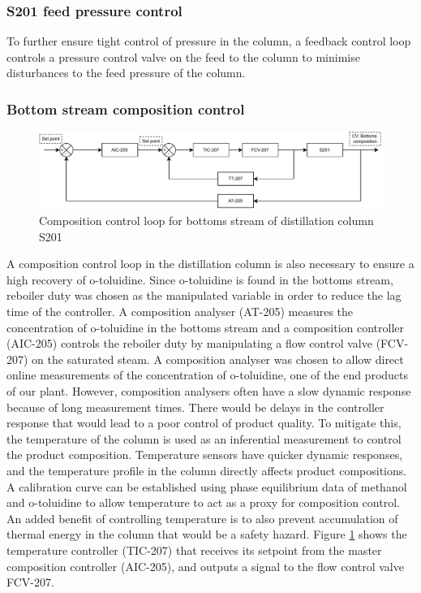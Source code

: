 \subsubsection{S201 feed pressure control} %
To further ensure tight control of pressure in the column, a feedback control loop controls a pressure control valve on the feed to the column to minimise disturbances to the feed pressure of the column.



\subsubsection{Bottom stream composition control} %
\begin{figure}
    \centering
    \includegraphics[width=\linewidth]{chapters/4-operation-control/4-Figures/S201-CC.pdf}
    \caption{Composition control loop for bottoms stream of distillation column S201}
    \label{fig:S201-CC}
\end{figure}
A composition control loop in the distillation column is also necessary to ensure a high recovery of o-toluidine. Since o-toluidine is found in the bottoms stream, reboiler duty was chosen as the manipulated variable in order to reduce the lag time of the controller. A composition analyser (AT-205) measures the concentration of o-toluidine in the bottoms stream and a composition controller (AIC-205) controls the reboiler duty by manipulating a flow control valve (FCV-207) on the saturated steam. 
A composition analyser was chosen to allow direct online measurements of the concentration of o-toluidine, one of the end products of our plant. However, composition analysers often have a slow dynamic response because of long measurement times. There would be delays in the controller response that would lead to a poor control of product quality. To mitigate this, the temperature of the column is used as an inferential measurement to control the product composition. Temperature sensors have quicker dynamic responses, and the temperature profile in the column directly affects product compositions. A calibration curve can be established using phase equilibrium data of methanol and o-toluidine to allow temperature to act as a proxy for composition control. An added benefit of controlling temperature is to also prevent accumulation of thermal energy in the column that would be a safety hazard. Figure \ref{fig:S201-CC} shows the temperature controller (TIC-207) that receives its setpoint from the master composition controller (AIC-205), and outputs a signal to the flow control valve FCV-207.




